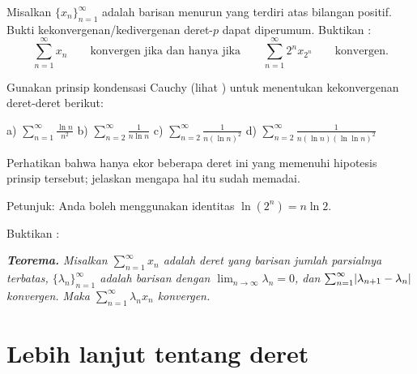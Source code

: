 \begin{exercise}[Menantang] \label{exercise:cauchycondensation}
Misalkan $\{ x_n\}_{n=1}^\infty$ adalah barisan menurun yang terdiri atas bilangan positif.
Bukti kekonvergenan/kedivergenan deret-$p$ dapat diperumum.
Buktikan
\emph{}:
\begin{equation*}
\sum_{n=1}^\infty x_n
\qquad \text{konvergen jika dan hanya jika} \qquad
\sum_{n=1}^\infty 2^n x_{2^n} \qquad \text{konvergen}.
\end{equation*}
\end{exercise}

\begin{exercise}
Gunakan prinsip kondensasi Cauchy
(lihat )
untuk menentukan kekonvergenan deret-deret berikut:

\medskip

\noindent
a) $\displaystyle \sum_{n=1}^\infty \frac{\ln n}{n^2}$
\qquad
b) $\displaystyle \sum_{n=2}^\infty \frac{1}{n \ln n}$
\qquad
c) $\displaystyle \sum_{n=2}^\infty \frac{1}{n {(\ln n)}^2}$
\qquad
d) $\displaystyle \sum_{n=2}^\infty \frac{1}{n (\ln n ){(\ln \ln n)}^2}$

\medskip

\noindent
Perhatikan bahwa hanya ekor beberapa deret ini yang memenuhi
hipotesis prinsip tersebut; jelaskan mengapa hal itu sudah memadai.

\noindent
Petunjuk: Anda boleh menggunakan identitas $\ln (2^n) = n \ln 2$.
\end{exercise}

\begin{exercise}[Menantang]
Buktikan \emph{}:

\medskip

\noindent
\emph{\textbf{Teorema.} Misalkan $\sum_{n=1}^\infty x_n$ adalah deret yang barisan jumlah parsialnya
terbatas, $\{ \lambda_n \}_{n=1}^\infty$ adalah barisan dengan
$\lim_{n\to\infty} \lambda_n = 0$, dan
$\sum_{n=1}^\infty \lvert { \lambda_{n+1} - \lambda_n } \rvert$ konvergen.
Maka $\sum_{n=1}^\infty \lambda_n x_n$ konvergen.}
\end{exercise}




\sectionnewpage
\section{Lebih lanjut tentang deret}
\label{sec:moreonseries}

